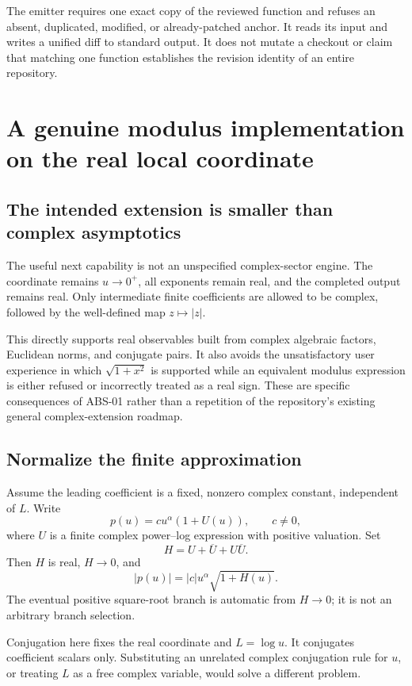\documentclass[11pt]{article}
\theoremstyle{remark}\newtheorem{remark}[theorem]{Remark}
\begin{document}
The emitter requires one exact copy of the reviewed function and refuses an
absent, duplicated, modified, or already-patched anchor. It reads its input and
writes a unified diff to standard output. It does not mutate a checkout or
claim that matching one function establishes the revision identity of an
entire repository.

\section{A genuine modulus implementation on the real local coordinate}
\label{sec:modulus}
\subsection{The intended extension is smaller than complex asymptotics}
The useful next capability is not an unspecified complex-sector engine.
The coordinate remains \(u\to0^+\), all exponents remain real, and the completed
output remains real. Only intermediate finite coefficients are allowed to be
complex, followed by the well-defined map \(z\mapsto|z|\).

This directly supports real observables built from complex algebraic factors,
Euclidean norms, and conjugate pairs. It also avoids the unsatisfactory user
experience in which \(\sqrt{1+x^2}\) is supported while an equivalent modulus
expression is either refused or incorrectly treated as a real sign.
These are specific consequences of ABS-01 rather than a repetition of the
repository's existing general complex-extension roadmap.

\subsection{Normalize the finite approximation}
Assume the leading coefficient is a fixed, nonzero complex constant, independent
of \(L\). Write
\[
 p(u)=c u^\alpha(1+U(u)),\qquad c\ne0,
\]
where \(U\) is a finite complex power--log expression with positive valuation.
Set
\begin{equation}\label{eq:H}
 H=U+\overline U+U\overline U.
\end{equation}
Then \(H\) is real, \(H\to0\), and
\begin{equation}\label{eq:normunit}
 |p(u)|=|c|u^\alpha\sqrt{1+H(u)}.
\end{equation}
The eventual positive square-root branch is automatic from \(H\to0\); it is not
an arbitrary branch selection.

Conjugation here fixes the real coordinate and \(L=\log u\). It conjugates
coefficient scalars only. Substituting an unrelated complex conjugation rule
for \(u\), or treating \(L\) as a free complex variable, would solve a different
problem.
\end{document}
